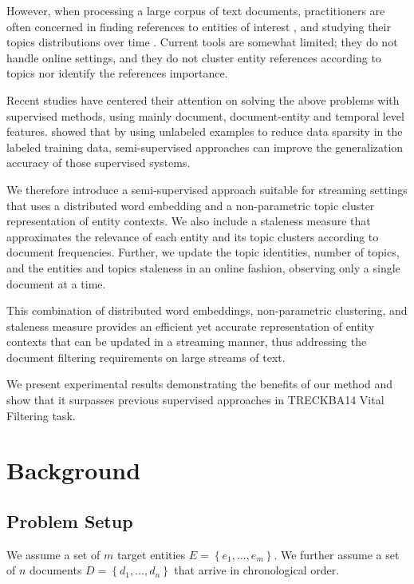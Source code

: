 \documentclass{article}
\begin{document}
However, when processing a large corpus of text documents, practitioners are often concerned in finding references to entities of interest \cite{RaoMD10, choi2007}, and studying their topics distributions over time \cite{blei12}. Current tools are somewhat limited; they do not handle online settings, and they do not cluster entity references according to topics nor identify the references importance.

Recent studies \cite{xitong13, bouvier13, efron13, zhang13, bellogin13} have centered their attention on solving the above problems with supervised methods, using mainly document, document-entity and temporal level features. \citet{Turian10wordrepresentations} showed that by using unlabeled examples to reduce data sparsity in the labeled training data, semi-supervised approaches can improve the generalization accuracy of those supervised systems.

We therefore introduce a semi-supervised approach suitable for streaming settings that uses a distributed word embedding and a non-parametric topic cluster representation of entity contexts. We also include a staleness measure that approximates the relevance of each entity and its topic clusters according to document frequencies. Further, we update the topic identities, number of topics, and the entities and topics staleness in an online fashion, observing only a single document at a time.

This combination of distributed word embeddings, non-parametric clustering, and staleness measure provides an efficient yet accurate representation of entity contexts that can be updated in a streaming manner, thus addressing the document filtering requirements on large streams of text.

We present experimental results demonstrating the benefits of our method and show that it surpasses previous supervised approaches in TRECKBA14 Vital Filtering task.

\section{Background}
\label{background}

\subsection{Problem Setup}
\label{setup}

We assume a set of $m$ target entities $E = \left\{ {e_1, ..., e_m}\right\}$. We further assume a set of $n$ documents $D = \left\{ {d_{1}, ..., d_{n}}\right\}$ that arrive in chronological order. 
 
\end{document}
